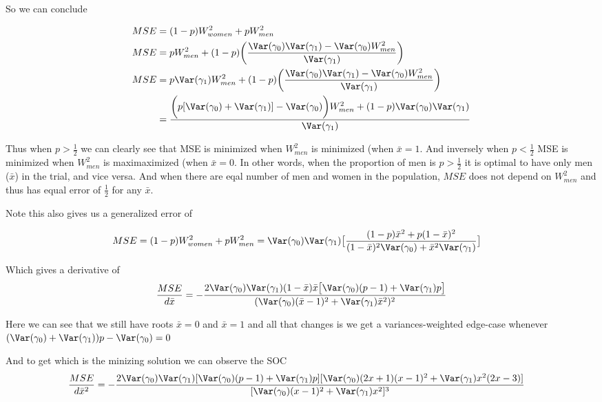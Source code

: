 So we can conclude

\begin{align*}
	MSE &= (1 - p) W^2_{women} + p W^2_{men} \\
	MSE &= p W^{2}_{men} + (1-p) \bigg(\frac{\Var(\gamma_0) \Var(\gamma_1) - \Var(\gamma_0) W^{2}_{men}}{\Var(\gamma_1)} \bigg) \\
	MSE &= p \Var(\gamma_1) W^{2}_{men} + (1-p) \bigg(\frac{\Var(\gamma_0) \Var(\gamma_1) - \Var(\gamma_0) W^{2}_{men}}{\Var(\gamma_1)} \bigg) \\
	&= \frac{\bigg(p[\Var(\gamma_0) + \Var(\gamma_1)]- \Var(\gamma_0)\bigg) W^{2}_{men} + (1-p) \Var(\gamma_0) \Var(\gamma_1)}{\Var(\gamma_1)}
\end{align*} 

Thus when $p > \frac{1}{2}$ we can clearly see that MSE is minimized when $W_{men}^2$ is minimized (when $\bar{x} = 1$. And inversely when $p < \frac{1}{2}$ MSE is minimized when $W_{men}^2$ is maximaximized (when $\bar{x} = 0$. In other words, when the proportion of men is  $p > \frac{1}{2}$ it is optimal to have only men ($\bar{x}$) in the trial, and vice versa. And when there are eqal number of men and women in the population,  $MSE$ does not depend on $W_{men}^2$ and thus has equal error of $ \frac{1}{2}$ for any $\bar{x}$.


Note this also gives us a generalized error of

\begin{align*}
	MSE = (1-p)W_{women}^2 + p W_{men}^2 &= \Var(\gamma_0) \Var(\gamma_1) \big[ \frac{(1-p)\bar{x}^2 + p(1- \bar{x})^2}{(1-\bar{x})^2 \Var(\gamma_0) + \bar{x}^2 \Var(\gamma_1)} \big]
\end{align*} 

Which gives a derivative of
\begin{align*}
	\frac{MSE}{d\bar{x}} = -\frac{ 2 \Var(\gamma_0) \Var(\gamma_1) (1 - \bar{x}) \bar{x} \big[\Var(\gamma_0) (p - 1) + \Var(\gamma_1) p\big] }{(\Var(\gamma_0) (\bar{x} - 1)^2 + \Var(\gamma_1) \bar{x}^2)^2}
\end{align*} 

Here we can see that we still have roots $\bar{x} = 0$ and $\bar{x} = 1$ and all that changes is we get a variances-weighted edge-case whenever $(\Var(\gamma_0) + \Var(\gamma_1))p - \Var(\gamma_0) = 0$

And to get which is the minizing solution we can observe the SOC 
\begin{align*}
	\frac{MSE}{d \bar{x}^2} &= -\frac{2 \Var(\gamma_0) \Var(\gamma_1) [ \Var(\gamma_0) (p - 1) + \Var(\gamma_1) p ] [ \Var(\gamma_0) (2 x + 1) (x - 1)^2 + \Var(\gamma_1) x^2 (2 x - 3) ]}{[ \Var(\gamma_0) (x - 1)^2 + \Var(\gamma_1) x^2 ]^3}
\end{align*} 

